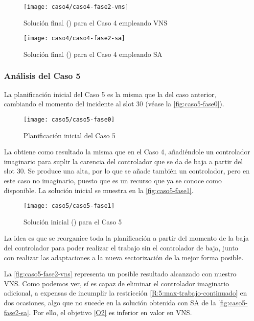 \begin{figure}[!]
	\centering
	\texttt{[image: caso4/caso4-fase2-vns]}
	\caption{Solución final (\fasedos{}) para el Caso 4 empleando VNS}
	\label{fig:caso4-fase2-vns}
\end{figure}

\begin{figure}[!]
	\centering
	\texttt{[image: caso4/caso4-fase2-sa]}
	\caption{Solución final (\fasedos{}) para el Caso 4 empleando SA}
	\label{fig:caso4-fase2-sa}
\end{figure}

\subsubsection{Análisis del Caso 5}

La planificación inicial del Caso 5 es la misma que la del caso anterior, cambiando el momento del incidente al slot 30 (véase la \autoref{fig:caso5-fase0}).

\begin{figure}[!]
	\centering
	\texttt{[image: caso5/caso5-fase0]}
	\caption{Planificación inicial del Caso 5}
	\label{fig:caso5-fase0}
\end{figure}

La \faseuno{} obtiene como resultado la misma que en el Caso 4, añadiéndole un controlador imaginario para suplir la carencia del controlador que se da de baja a partir del slot 30. Se produce una alta, por lo que se añade también un controlador, pero en este caso no imaginario, puesto que es un recurso que ya se conoce como disponible. La solución inicial se muestra en la \autoref{fig:caso5-fase1}.

\begin{figure}[!]
	\centering
	\texttt{[image: caso5/caso5-fase1]}
	\caption{Solución inicial (\faseuno{}) para el Caso 5}
	\label{fig:caso5-fase1}
\end{figure}

La idea es que se reorganice toda la planificación a partir del momento de la baja del controlador para poder realizar el trabajo sin el controlador de baja, junto con realizar las adaptaciones a la nueva sectorización de la mejor forma posible.

La \autoref{fig:caso5-fase2-vns} representa un posible resultado alcanzado con nuestro VNS. Como podemos ver, sí es capaz de eliminar el controlador imaginario adicional, a expensas de incumplir la restricción \ref{R:5:max-trabajo-continuado} en dos ocasiones, algo que no sucede en la solución obtenida con SA de la \autoref{fig:caso5-fase2-sa}. Por ello, el objetivo \ref{O2} es inferior en valor en VNS.

